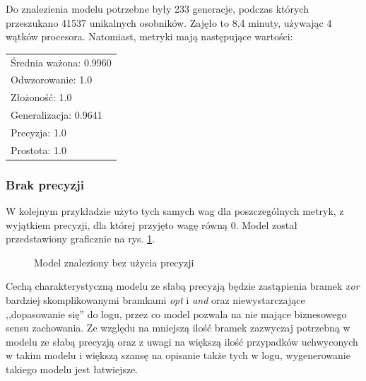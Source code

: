 Do znalezienia modelu potrzebne były 233 generacje, podczas których przeszukano 41537 unikalnych osobników. Zajęło to 8.4 minuty, używając 4 wątków procesora. Natomiast, metryki mają następujące wartości: 

 \begin{center}
  \begin{tabular}{l}
	Średnia ważona: 0.9960 \\
	Odwzorowanie: 1.0 \\
	Złożoność: 1.0 \\
	Generalizacja: 0.9641 \\
	Precyzja: 1.0 \\
	Prostota: 1.0
  \end{tabular}
 \end{center}

\subsubsection{Brak precyzji}
W kolejnym przykładzie użyto tych samych wag dla poszczególnych metryk, z wyjątkiem precyzji, dla której przyjęto wagę równą 0. Model został przedstawiony graficznie na rys. \ref{fig:p7_model}.

\begin{figure}[!ht]
	\caption{\label{fig:p7_model}Model znaleziony bez użycia precyzji}
\end{figure}

Cechą charakterystyczną modelu ze słabą precyzją będzie zastąpienia bramek \textit{xor} bardziej skomplikowanymi bramkami \textit{opt} i \textit{and} oraz niewystarczające ,,dopasowanie się'' do logu, przez co model pozwala na nie mające biznesowego sensu zachowania. Ze względu na mniejszą ilość bramek zazwyczaj potrzebną w modelu ze słabą precyzją oraz z uwagi na większą ilość przypadków uchwyconych w takim modelu i większą szansę na opisanie także tych w logu, wygenerowanie takiego modelu jest łatwiejsze.
 
